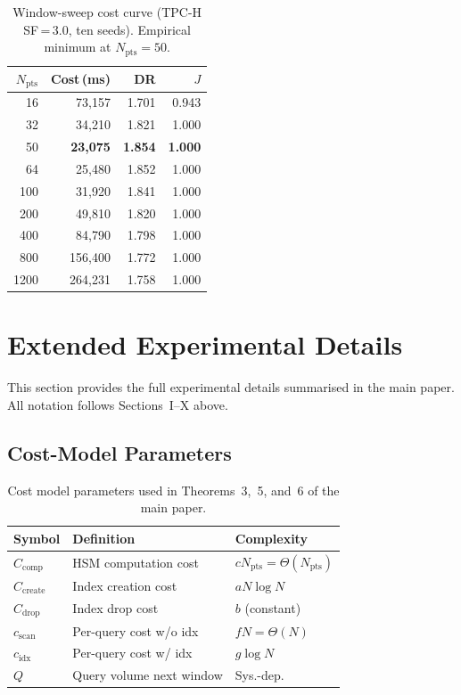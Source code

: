 \documentclass[10pt,twocolumn,a4paper]{article}
\newcommand{\Npts}{N_{\mathrm{pts}}}
\begin{document}
\begin{table}[htbp]\centering\small
\caption{Window-sweep cost curve (TPC-H SF\,=\,3.0, ten seeds).
Empirical minimum at $\Npts\!=\!50$.}\label{tab:supp-optwin-cost}
\begin{tabular}{@{}rrrr@{}}
\toprule
\textbf{$\Npts$} & \textbf{Cost\,(ms)} & \textbf{DR} & \textbf{$J$}\\
\midrule
16   & 73{,}157  & 1.701 & 0.943\\
32   & 34{,}210  & 1.821 & 1.000\\
50   & \textbf{23{,}075} & \textbf{1.854} & \textbf{1.000}\\
64   & 25{,}480  & 1.852 & 1.000\\
100  & 31{,}920  & 1.841 & 1.000\\
200  & 49{,}810  & 1.820 & 1.000\\
400  & 84{,}790  & 1.798 & 1.000\\
800  & 156{,}400 & 1.772 & 1.000\\
1200 & 264{,}231 & 1.758 & 1.000\\
\bottomrule
\end{tabular}
\end{table}

\section{Extended Experimental Details}\label{supp:experiments}

This section provides the full experimental details summarised in the
main paper. All notation follows Sections~I--X above.

\subsection{Cost-Model Parameters}\label{supp:costmodel}

\begin{table}[!htb]\centering\small
\caption{Cost model parameters used in Theorems~3,~5, and~6 of the main paper.}\label{tab:costmodel-supp}
\setlength{\tabcolsep}{3pt}
\begin{tabular}{@{}lp{3.1cm}l@{}}
\toprule
\textbf{Symbol} & \textbf{Definition} & \textbf{Complexity}\\
\midrule
$C_{\mathrm{comp}}$   & HSM computation cost     & $c\Npts\!=\!\Theta(\Npts)$\\
$C_{\mathrm{create}}$ & Index creation cost      & $aN\!\log N$\\
$C_{\mathrm{drop}}$   & Index drop cost          & $b$ (constant)\\
$c_{\mathrm{scan}}$   & Per-query cost w/o idx   & $fN\!=\!\Theta(N)$\\
$c_{\mathrm{idx}}$    & Per-query cost w/ idx    & $g\!\log N$\\
$Q$                   & Query volume next window & Sys.-dep.\\
\bottomrule
\end{tabular}
\end{table}
\end{document}
